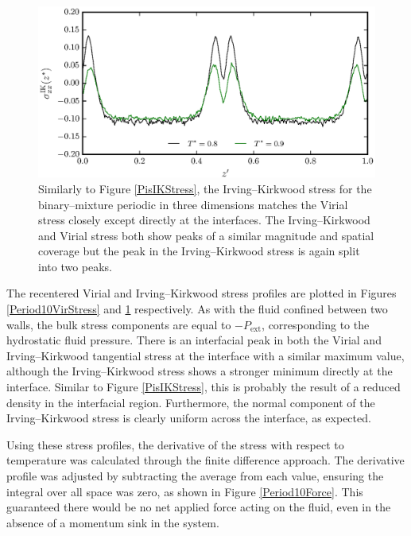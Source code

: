 \begin{figure}[h]
\centering
\includegraphics[scale=0.8]{Period10IKStress}
\caption{Similarly to Figure \ref{PisIKStress}, the Irving--Kirkwood stress for the binary--mixture periodic in three dimensions matches the Virial stress closely except directly at the interfaces.
The Irving--Kirkwood and Virial stress both show peaks of a similar magnitude and spatial coverage but the peak in the Irving--Kirkwood stress is again split into two peaks.
}
\label{Period10IKStress}
\end{figure}
The recentered Virial and Irving--Kirkwood stress profiles are plotted in Figures \ref{Period10VirStress} and \ref{Period10IKStress} respectively.
As with the fluid confined between two walls, the bulk stress components are equal to $-P_{\mathrm{ext}}$, corresponding to the hydrostatic fluid pressure.
There is an interfacial peak in both the Virial and Irving--Kirkwood tangential stress at the interface with a similar maximum value, although the Irving--Kirkwood stress shows a stronger minimum directly at the interface.
Similar to Figure \ref{PisIKStress}, this is probably the result of a reduced density in the interfacial region.
Furthermore, the normal component of the Irving--Kirkwood stress is clearly uniform across the interface, as expected.

\FloatBarrier
Using these stress profiles, the derivative of the stress with respect to temperature was calculated through the finite difference approach.
The derivative profile was adjusted by subtracting the average from each value, ensuring the integral over all space was zero, as shown in Figure \ref{Period10Force}.
This guaranteed there would be no net applied force acting on the fluid, even in the absence of a momentum sink in the system.

